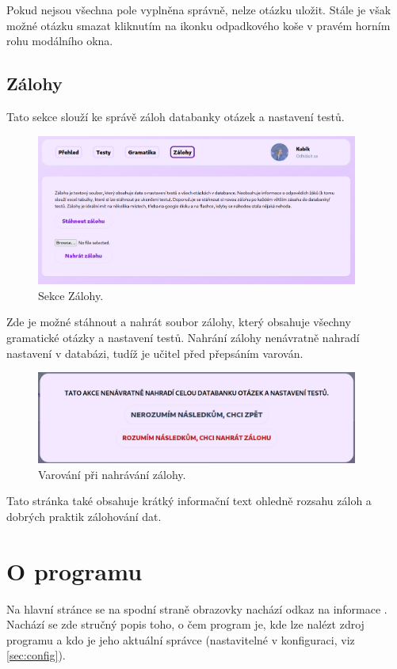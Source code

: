Pokud nejsou všechna pole vyplněna správně, nelze otázku uložit. Stále je však možné otázku smazat kliknutím na ikonku odpadkového koše v pravém horním rohu modálního okna.

\pagebreak
\subsection{Zálohy}

Tato sekce slouží ke správě záloh databanky otázek a nastavení testů. 

\begin{figure}[H]
    \centering
    \includegraphics[width=400px]{images/01design/backup.png}
    \caption{Sekce Zálohy.}
\end{figure}

Zde je možné stáhnout a nahrát soubor zálohy, který obsahuje všechny gramatické otázky a nastavení testů. Nahrání zálohy nenávratně nahradí nastavení v databázi, tudíž je učitel před přepsáním varován.

\begin{figure}[H]
    \centering
    \includegraphics[width=400px]{images/01design/backup-warning.png}
    \caption{Varování při nahrávání zálohy.}
\end{figure}

Tato stránka také obsahuje krátký informační text ohledně rozsahu záloh a dobrých praktik zálohování dat.

\pagebreak
\section{O programu}

Na hlavní stránce se na spodní straně obrazovky nachází odkaz na informace . Nachází se zde stručný popis toho, o čem program je, kde lze nalézt zdroj programu a kdo je jeho aktuální správce (nastavitelné v konfiguraci, viz \ref{sec:config}).

